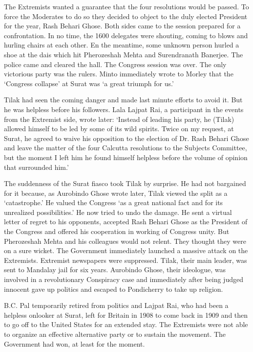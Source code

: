 \begin{multicols}{2}
The Extremists wanted a guarantee that the four resolutions would be passed. To force the Moderates to do so they decided to object to the duly elected President for the year, Rash Behari Ghose. Both sides came to the session prepared for a confrontation. In no time, the 1600 delegates were shouting, coming to blows and hurling chairs at each other. En the meantime, some unknown person hurled a shoe at the dais which hit Pherozeshah Mehta and Surendranath Banerjee. The police came and cleared the hall. The Congress session was over. The only victorious party was the rulers. Minto immediately wrote to Morley that the `Congress collapse' at Surat was `a great triumph for us.'

Tilak had seen the coming danger and made last minute efforts to avoid it. But he was helpless before his followers. Lala Lajpat Rai, a participant in the events from the Extremist side, wrote later: `Instead of leading his party, he (Tilak) allowed himself to be led by some of its wild spirits. Twice on my request, at Surat, he agreed to waive his opposition to the election of Dr. Rash Behari Ghose and leave the matter of the four Calcutta resolutions to the Subjects Committee, but the moment I left him he found himself helpless before the volume of opinion that surrounded him.'

The suddenness of the Surat fiasco took Tilak by surprise. He had not bargained for it because, as Aurobindo Ghose wrote later, Tilak viewed the split as a `catastrophe.' He valued the Congress `as a great national fact and for its unrealized possibilities.' He now tried to undo the damage. He sent a virtual letter of regret to his opponents, accepted Rash Behari Ghose as the President of the Congress and offered his cooperation in working of Congress unity. But Pherozeshah Mehta and his colleagues would not relent. They thought they were on a sure wicket. The Government immediately launched a massive attack on the Extremists. Extremist newspapers were suppressed. Tilak, their main leader, was sent to Mandalay jail for six years. Aurobindo Ghose, their ideologue, was involved in a revolutionary Conspiracy case and immediately after being judged innocent gave up politics and escaped to Pondicherry to take up religion.

B.C. Pal temporarily retired from politics and Lajpat Rai, who had been a helpless onlooker at Surat, left for Britain in 1908 to come back in 1909 and then to go off to the United States for an extended stay. The Extremists were not able to organize an effective alternative party or to sustain the movement. The Government had won, at least for the moment.


\end{multicols}
